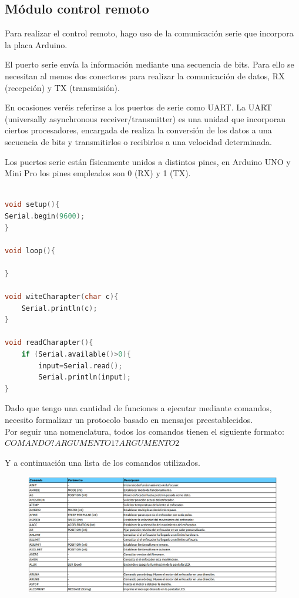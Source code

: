 \subsection{Módulo control remoto}

Para realizar el control remoto, hago uso de la comunicación serie que incorpora la placa Arduino.


El puerto serie envía la información mediante una secuencia de bits. Para ello se necesitan al menos dos conectores para realizar la comunicación de datos, RX (recepción) y TX (transmisión). 

En ocasiones veréis referirse a los puertos de serie como UART. La UART (universally asynchronous receiver/transmitter) es una unidad que incorporan ciertos procesadores, encargada de realiza la conversión de los datos a una secuencia de bits y transmitirlos o recibirlos a una velocidad determinada.

Los puertos serie están físicamente unidos a distintos pines, en Arduino UNO y Mini Pro los pines empleados son 0 (RX) y 1 (TX).


\begin{lstlisting}[language=C, caption={Ejemplo lectura y escritura puerto serie},label={lst:write_read_serial_port_sample}]

void setup(){
Serial.begin(9600);
}

void loop(){

}

void witeCharapter(char c){
	Serial.println(c);
}

void readCharapter(){
	if (Serial.available()>0){
		input=Serial.read();
		Serial.println(input);
}


\end{lstlisting}


Dado que tengo una cantidad de funciones a ejecutar mediante comandos, necesito formalizar un protocolo basado en mensajes preestablecidos. \\

Por seguir una nomenclatura, todos los comandos tienen el siguiente formato: \\


$ COMANDO?ARGUMENTO1?ARGUMENTO2  $

Y a continuación una lista de los comandos utilizados.


\begin{figure}[h]
\centering
\includegraphics[width=1.1\linewidth]{../images/comando_ardufocuser}
\caption{}
\label{fig:comando_ardufocuser}
\end{figure}

